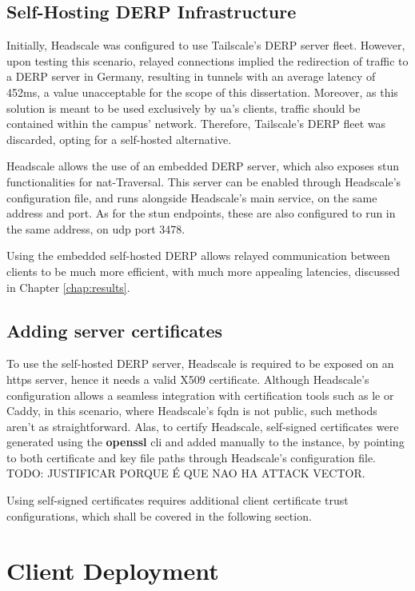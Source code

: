 \documentclass[11pt,twoside,a4paper]{report}
\begin{document}
\subsection{Self-Hosting DERP Infrastructure}

Initially, Headscale was configured to use Tailscale's \ac{DERP} server fleet. However, upon testing this scenario, relayed connections implied the redirection of traffic to a \ac{DERP} server in Germany, resulting in tunnels with an average latency of 452ms, a value unacceptable for the scope of this dissertation. Moreover, as this solution is meant to be used exclusively by \ac{ua}'s clients, traffic should be contained within the campus' network. Therefore, Tailscale's \ac{DERP} fleet was discarded, opting for a self-hosted alternative.

Headscale allows the use of an embedded \ac{DERP} server, which also exposes \ac{stun} functionalities for \ac{nat}-Traversal. This server can be enabled through Headscale's configuration file, and runs alongside Headscale's main service, on the same address and port. As for the \ac{stun} endpoints, these are also configured to run in the same address, on \ac{udp} port 3478.

Using the embedded self-hosted \ac{DERP} allows relayed communication between clients to be much more efficient, with much more appealing latencies, discussed in Chapter \ref{chap:results}.


\subsection{Adding server certificates}

To use the self-hosted \ac{DERP} server, Headscale is required to be exposed on an \ac{https} server, hence it needs a valid X509 certificate. Although Headscale's configuration allows a seamless integration with certification tools such as \ac{le} or Caddy, in this scenario, where Headscale's \ac{fqdn} is not public, such methods aren't as straightforward. Alas, to certify Headscale, self-signed certificates were generated using the \textbf{openssl} \ac{cli} and added manually to the instance, by pointing to both certificate and key file paths through Headscale's configuration file. TODO: JUSTIFICAR PORQUE É QUE NAO HA ATTACK VECTOR.

Using self-signed certificates requires additional client certificate trust configurations, which shall be covered in the following section.

\section{Client Deployment}
\end{document}
